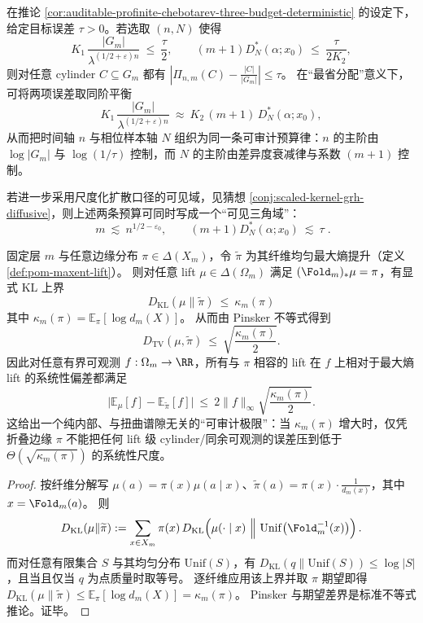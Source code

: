 \begin{corollary}\label{cor:auditable-profinite-chebotarev-balance-triangle}
在推论 \ref{cor:auditable-profinite-chebotarev-three-budget-deterministic} 的设定下，给定目标误差 \(\tau>0\)。若选取 \((n,N)\) 使得
\[
K_1\,\frac{|G_m|}{\lambda^{(1/2+\varepsilon)n}}\ \le\ \frac{\tau}{2},
\qquad
(m+1)D_N^*(\alpha;x_0)\ \le\ \frac{\tau}{2K_2},
\]
则对任意 cylinder \(C\subseteq G_m\) 都有
\(
\left|\Pi_{n,m}(C)-\frac{|C|}{|G_m|}\right|\le \tau
\)。
在“最省分配”意义下，可将两项误差取同阶平衡
\[
K_1\,\frac{|G_m|}{\lambda^{(1/2+\varepsilon)n}}
\ \approx\
K_2\,(m+1)\,D_N^*(\alpha;x_0),
\]
从而把时间轴 \(n\) 与相位样本轴 \(N\) 组织为同一条可审计预算律：\(n\) 的主阶由 \(\log|G_m|\) 与 \(\log(1/\tau)\) 控制，而 \(N\) 的主阶由差异度衰减律与系数 \((m+1)\) 控制。
\par
若进一步采用尺度化扩散口径的可见域，见猜想 \ref{conj:scaled-kernel-grh-diffusive}，则上述两条预算可同时写成一个“可见三角域”：
\[
\boxed{\;
m\ \lesssim\ n^{1/2-\varepsilon_0},
\qquad
(m+1)D_N^*(\alpha;x_0)\ \lesssim\ \tau\; }.
\]
\end{corollary}

\begin{theorem}\label{thm:defect-limited-audit}
固定层 \(m\) 与任意边缘分布 \(\pi\in\Delta(X_m)\)，令 \(\widetilde\pi\) 为其纤维均匀最大熵提升（定义 \ref{def:pom-maxent-lift}）。
则对任意 lift \(\mu\in\Delta(\Omega_m)\) 满足 \((\Fold_m)_*\mu=\pi\)，有显式 KL 上界
\[
\boxed{\;
D_{\mathrm{KL}}(\mu\|\widetilde\pi)\ \le\ \kappa_m(\pi)
\;}
\]
其中 \(\kappa_m(\pi)=\mathbb{E}_\pi[\log d_m(X)]\)。
从而由 Pinsker 不等式得到
\[
\boxed{\;
D_{\mathrm{TV}}(\mu,\widetilde\pi)\ \le\ \sqrt{\frac{\kappa_m(\pi)}{2}}.
\;}
\]
因此对任意有界可观测 \(f:\Omega_m\to\RR\)，所有与 \(\pi\) 相容的 lift 在 \(f\) 上相对于最大熵 lift 的系统性偏差都满足
\[
\boxed{\;
\bigl|\mathbb{E}_\mu[f]-\mathbb{E}_{\widetilde\pi}[f]\bigr|
\ \le\ 2\|f\|_\infty\sqrt{\frac{\kappa_m(\pi)}{2}}.
\;}
\]
这给出一个纯内部、与扭曲谱隙无关的“可审计极限”：当 \(\kappa_m(\pi)\) 增大时，仅凭折叠边缘 \(\pi\) 不能把任何 lift 级 cylinder/同余可观测的误差压到低于 \(\Theta(\sqrt{\kappa_m(\pi)})\) 的系统性尺度。
\end{theorem}

\begin{proof}
按纤维分解写 \(\mu(a)=\pi(x)\mu(a\mid x)\)、\(\widetilde\pi(a)=\pi(x)\cdot \frac{1}{d_m(x)}\)，其中 \(x=\Fold_m(a)\)。
则
\[
D_{\mathrm{KL}}(\mu\|\widetilde\pi)
:=\sum_{x\in X_m}\pi(x)\,D_{\mathrm{KL}}\!\left(\mu(\cdot\mid x)\ \Big\|\ \mathrm{Unif}\big(\Fold_m^{-1}(x)\big)\right).
\]
而对任意有限集合 \(S\) 与其均匀分布 \(\mathrm{Unif}(S)\)，有 \(D_{\mathrm{KL}}(q\|\mathrm{Unif}(S))\le \log|S|\)，且当且仅当 \(q\) 为点质量时取等号。
逐纤维应用该上界并取 \(\pi\) 期望即得 \(D_{\mathrm{KL}}(\mu\|\widetilde\pi)\le \mathbb{E}_\pi[\log d_m(X)]=\kappa_m(\pi)\)。
Pinsker 与期望差界是标准不等式推论。证毕。
\end{proof}

